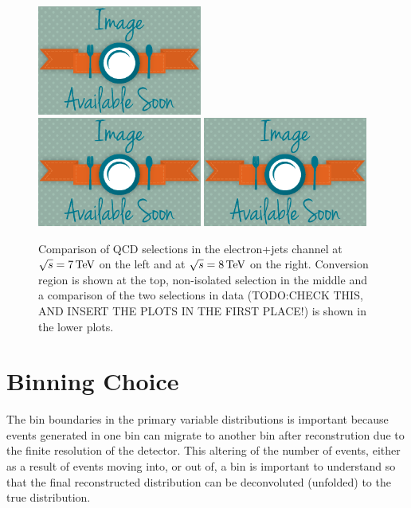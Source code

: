 \begin{figure}[hbtp]
     \includegraphics[width=0.48\textwidth]{Chapters/04_Analysis/04b_XSections/images/placeholder.png}\\
     \includegraphics[width=0.48\textwidth]{Chapters/04_Analysis/04b_XSections/images/placeholder.png}\hfill
     \includegraphics[width=0.48\textwidth]{Chapters/04_Analysis/04b_XSections/images/placeholder.png}\\
     \caption{Comparison of QCD selections in the electron+jets channel at $\sqrt{s}=7\,\text{Te\hspace{-.08em}V}$ on the left
     and at $\sqrt{s}=8\,\text{Te\hspace{-.08em}V}$ on the right. Conversion region is shown at the top, non-isolated selection
     in the middle and a comparison of the two selections in data (TODO:CHECK THIS, AND INSERT THE PLOTS IN
     THE FIRST PLACE!)
     is shown in the lower plots.}
     \label{fig:data_mc_comparison_electron_QCD}
 \end{figure}

\section{Binning Choice}
\label{s:binning_choice}
The bin boundaries in the primary variable distributions is important because events generated in one bin can
migrate to another bin after reconstrution due to the finite resolution of the detector. This altering of the
number of events, either as a result of events moving into, or out of, a bin is important to understand so
that the final reconstructed distribution can be deconvoluted (unfolded) to the true distribution.

